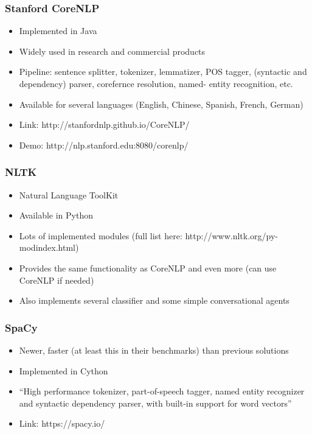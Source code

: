 \begin{frame}[fragile]\frametitle{Stanford CoreNLP}
  \begin{itemize}
    \item  Implemented in Java
    \item Widely used in research and commercial products
    \item Pipeline: sentence splitter, tokenizer, lemmatizer, POS tagger, 
(syntactic and dependency) parser, corefernce resolution, named-
entity recognition, etc.
    \item Available for several languages (English, Chinese, Spanish, French, 
German)
    \item Link: http://stanfordnlp.github.io/CoreNLP/
    \item Demo: http://nlp.stanford.edu:8080/corenlp/
      \end{itemize}
\end{frame}

\begin{frame}[fragile]\frametitle{NLTK}
  \begin{itemize}
    \item Natural Language ToolKit
    \item Available in Python
    \item Lots of implemented modules (full list here: http://www.nltk.org/py-
modindex.html) 
    \item Provides the same functionality as CoreNLP and even more (can use 
CoreNLP if needed)
    \item Also implements several classifier and some simple conversational 
agents
      \end{itemize}
\end{frame}


\begin{frame}[fragile]\frametitle{SpaCy}
  \begin{itemize}
    \item   Newer, faster (at least this in their benchmarks) than previous 
solutions
    \item Implemented in Cython
    \item ``High performance tokenizer, part-of-speech tagger, named entity 
recognizer and syntactic dependency parser, with built-in support for 
word vectors''
    \item Link: https://spacy.io/
      \end{itemize}
\end{frame}


